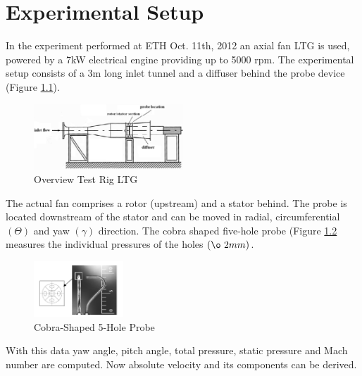 
\chapter{Experimental Setup}\label{sec:experimentalsetup}

In the experiment performed at ETH Oct. 11th, 2012 an axial fan LTG is used, powered by a 7kW electrical engine providing up to 5000 rpm. The experimental setup consists of a 3m long inlet tunnel and a diffuser behind the probe device (Figure \ref{fig:f2}). 

\begin{figure}[H]
\centering
\includegraphics[width=0.5\textwidth]{pics/f2.png}
\caption{Overview Test Rig LTG}
\label{fig:f2}
\end{figure}

The actual fan comprises a rotor (upstream) and a stator behind. The probe is located downstream of the stator and can be moved in radial, circumferential $(\Theta)$ and yaw $(\gamma)$ direction. The cobra shaped five-hole probe (Figure \ref{fig:f3} measures the individual pressures of the holes $(\o~ 2mm)$. 

\begin{figure}[H]
\centering
\includegraphics[width=0.3\textwidth]{pics/f3.png}
\caption{Cobra-Shaped 5-Hole Probe}
\label{fig:f3}
\end{figure}

With this data yaw angle, pitch angle, total pressure, static pressure and Mach number are computed. Now absolute velocity and its components can be derived.


